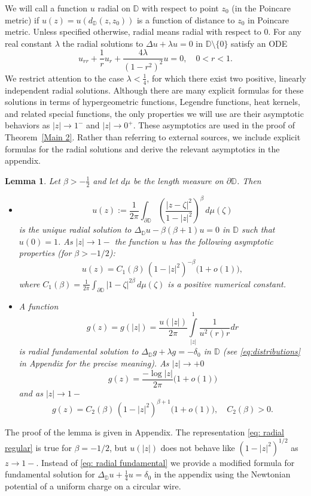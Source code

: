 \documentclass{article}
\newtheorem{lemma}{Lemma}[section]
\begin{document}
We will call a function $u$ radial on $\mathbb{D}$ with respect to point $z_0$ (in the Poincare metric) if
$u(z)=u(d_\mathbb{D}(z,z_0))$ is a function of distance to $z_0$ in Poincare metric. Unless specified otherwise, radial means radial with respect to $0$.
For any real constant $\lambda$ the radial solutions to $\Delta u + \lambda u = 0$ in $\mathbb{D}\setminus{\{0\}}$ satisfy an ODE
\[
u_{rr} + \frac{1}{r}u_{r} + \frac{4\lambda}{(1-r^2)^2}u = 0,
\quad 0<r<1.
\]
We restrict attention to the case $\lambda < \frac{1}{4}$, for which there exist two positive, linearly independent radial solutions. Although there are many explicit formulas for these solutions in terms of hypergeometric functions, Legendre functions, heat kernels, and related special functions, the only properties we will use are their asymptotic behaviors as $|z| \to 1^-$ and $|z| \to 0^+$. These asymptotics are used in the proof of Theorem~\ref{Main 2}. Rather than referring to external sources, we include explicit formulas for the radial solutions and derive the relevant asymptotics in the appendix. 
\begin{lemma} \label{Lemma:asymptotics}
Let $\beta>-\frac{1}{2}$ and let $d\mu$ be the length measure on $\partial \mathbb{D}$. Then
\begin{itemize}
    \item  \begin{equation} \label{eq: radial regular}
u(z)
:= \frac{1}{2\pi}\int_{\partial\mathbb{D}}
\left(\frac{|z-\zeta|^2}{1-|z|^2}\right)^{\beta} \, d\mu(\zeta)
\end{equation}
is the unique radial solution to $\Delta_\mathbb{D} u-\beta(\beta+1)u = 0$ in $\mathbb{D}$ such that $u(0)=1$. As $|z|\to 1-$ the function $u$ has the following asymptotic properties (for $\beta > -1/2$):
\[
u(z)
= C_1(\beta)\,(1 - |z|^2)^{-\beta}\bigl(1+o(1)\bigr),
\]
where $C_1(\beta)=\frac{1}{2\pi}\int_{\partial\mathbb{D}}
|1-\zeta|^{2\beta} \, d\mu(\zeta)$ is a positive numerical constant.
   
    \item A function 
    \begin{equation} \label{eq: radial fundamental}
    g(z)= g(|z|)= \frac{u(|z|)}{2\pi}\int
    \limits_{|z|}^{1}\frac{1}{u^2(r)r}dr
    \end{equation}
      is radial fundamental solution to
    $\Delta_\mathbb{D} g+\lambda g = -\delta_0$
    in $\mathbb{D}$ (see \eqref{eq:distributions} in Appendix for the precise meaning).  As $|z|\to +0$ $$g(z)= \frac{-\log|z|}{2\pi}\bigl(1+o(1)\bigr)$$
    and as $|z|\to 1-$ 
\[
g(z)
= C_2(\beta)\,(1 - |z|^2)^{\beta+1}\bigl(1+o(1)\bigr), \quad C_2(\beta) >0.
\]
    
\end{itemize}
\end{lemma}
The proof of the lemma is given in Appendix. The representation \eqref{eq: radial regular} is true for $\beta=-1/2$, but  $u(|z|)$ does not behave like $(1-|z|^2)^{1/2}$ as $z\to 1-$.  Instead of \eqref{eq: radial fundamental} we provide a modified formula for fundamental solution
for $\Delta_{\mathbb{D}} u+\frac{1}{4}u=\delta_0$ in the appendix using the Newtonian potential of a uniform
charge on a circular wire.
\end{document}
